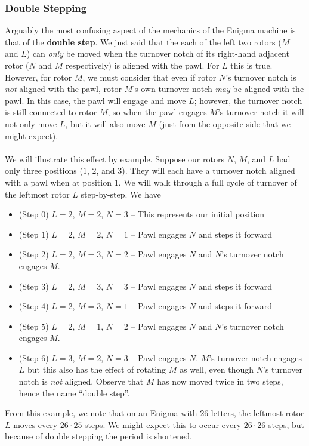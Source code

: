 \subsubsection{Double Stepping}\label{double_step}
Arguably the most confusing aspect of the mechanics of the Enigma
machine is that of the {\bf{double step}}. We just said that the each
of the left two rotors ($M$ and $L$) can \emph{only} be moved when
the turnover notch of its right-hand adjacent rotor ($N$ and $M$
respectively) is aligned with the pawl. For $L$ this is true.
However, for rotor $M$, we must consider that even if rotor $N$'s
turnover notch is \emph{not} aligned with the pawl, rotor $M$'s own
turnover notch \emph{may} be aligned with the pawl. In this case, the
pawl will engage and move $L$; however, the turnover notch is still
connected to rotor $M$, so when the pawl engages $M$'s turnover notch
it will not only move $L$, but it will also move $M$ (just from the opposite side that we might expect).
\\\\We will illustrate this effect by example. Suppose our rotors
$N$, $M$, and $L$ had only three positions ($1$, $2$, and $3$). They
will each have a turnover notch aligned with a pawl when at position
$1$. We will walk through a full cycle of turnover of the leftmost
rotor $L$ step-by-step. We have
\begin{itemize}
  \item (Step $0$) $L = 2$, $M = 2$, $N = 3$ -- This represents our
    initial position
  \item (Step $1$) $L = 2$, $M = 2$, $N = 1$ -- Pawl engages $N$ and
    steps it forward
  \item (Step $2$) $L = 2$, $M = 3$, $N = 2$ -- Pawl engages $N$ and
    $N$'s turnover notch engages $M$.
  \item (Step $3$) $L = 2$, $M = 3$, $N = 3$ -- Pawl engages $N$ and
    steps it forward
  \item (Step $4$) $L = 2$, $M = 3$, $N = 1$ -- Pawl engages $N$ and
    steps it forward
  \item (Step $5$) $L = 2$, $M = 1$, $N = 2$ -- Pawl engages $N$ and
    $N$'s turnover notch engages $M$.
  \item (Step $6$) $L = 3$, $M = 2$, $N = 3$ -- Pawl engages $N$.
    $M$'s turnover notch engages $L$ but this also has the effect of
    rotating $M$ as well, even though $N$'s turnover notch is
    \emph{not} aligned. Observe that $M$ has now moved twice in two
    steps, hence the name ``double step''.
\end{itemize}
From this example, we note that on an Enigma with 26 letters, the leftmost rotor $L$
moves every $26\cdot25$ steps. We might expect this to occur every $26\cdot26$ steps, but
because of double stepping the period is shortened. 
